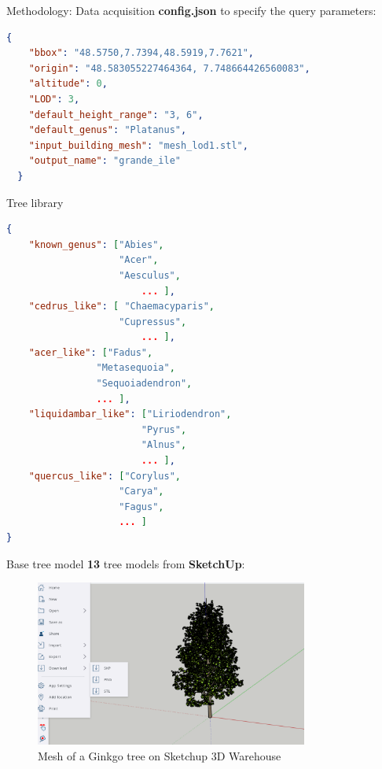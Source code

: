 \documentclass[10pt]{beamer}
\begin{document}
\begin{frame}[fragile]{Methodology: Data acquisition}
  \textbf{config.json} to specify the query parameters:
  \begin{lstlisting}[language=json]
  {
    "bbox": "48.5750,7.7394,48.5919,7.7621",
    "origin": "48.583055227464364, 7.748664426560083",
    "altitude": 0,
    "LOD": 3,
    "default_height_range": "3, 6",
    "default_genus": "Platanus",
    "input_building_mesh": "mesh_lod1.stl",
    "output_name": "grande_ile"
  }
  \end{lstlisting}
\end{frame}

\begin{frame}[fragile]{Tree library}
  \Large
\begin{lstlisting}[language=json]
{
    "known_genus": ["Abies",
                    "Acer",
                    "Aesculus",
                        ... ],
    "cedrus_like": [ "Chaemacyparis",
                    "Cupressus",
                        ... ],
    "acer_like": ["Fadus",
                "Metasequoia",
                "Sequoiadendron",
                ... ],
    "liquidambar_like": ["Liriodendron",
                        "Pyrus",
                        "Alnus",
                        ... ],
    "quercus_like": ["Corylus",
                    "Carya",
                    "Fagus",
                    ... ]
}
\end{lstlisting}
\end{frame}

\begin{frame}{Base tree model}
  \Large
\textbf{13} tree models from \textbf{SketchUp}:

\begin{figure}[H]
    \centering
        \centering
        \includegraphics[width=0.8\textwidth]{images/ginkgo_sketchup.png}
        \caption{Mesh of a Ginkgo tree on Sketchup 3D Warehouse}
\end{figure}
\end{frame}
\end{document}
